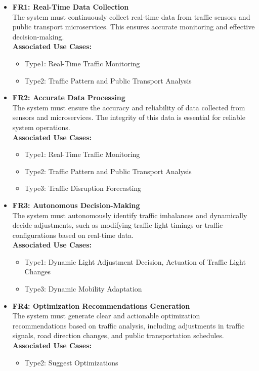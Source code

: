 \documentclass[a4paper,12pt]{article}
\begin{document}
\begin{itemize}
\item \textbf{FR1: Real-Time Data Collection} \\
The system must continuously collect real-time data from traffic sensors and public transport microservices. This ensures accurate monitoring and effective decision-making. \\
\textbf{Associated Use Cases:}
\begin{itemize}
\item Type1: Real-Time Traffic Monitoring
\item Type2: Traffic Pattern and Public Transport Analysis
\end{itemize}
\item \textbf{FR2: Accurate Data Processing} \\
The system must ensure the accuracy and reliability of data collected from sensors and microservices. The integrity of this data is essential for reliable system operations. \\
\textbf{Associated Use Cases:}
\begin{itemize}
\item Type1: Real-Time Traffic Monitoring
\item Type2: Traffic Pattern and Public Transport Analysis
\item Type3: Traffic Disruption Forecasting
\end{itemize}
\item \textbf{FR3: Autonomous Decision-Making} \\
The system must autonomously identify traffic imbalances and dynamically decide adjustments, such as modifying traffic light timings or traffic configurations based on real-time data. \\
\textbf{Associated Use Cases:}
\begin{itemize}
\item Type1: Dynamic Light Adjustment Decision, Actuation of Traffic Light Changes
\item Type3: Dynamic Mobility Adaptation
\end{itemize}

\item \textbf{FR4: Optimization Recommendations Generation} \\
The system must generate clear and actionable optimization recommendations based on traffic analysis, including adjustments in traffic signals, road direction changes, and public transportation schedules. \\
\textbf{Associated Use Cases:}
\begin{itemize}
\item Type2: Suggest Optimizations
\end{itemize}


\end{itemize}
\end{document}
